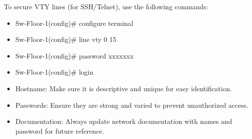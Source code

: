 \documentclass[a4paper,11pt]{article}
\begin{document}
\begin{tcolorbox}[colframe=gray!80, colback=gray!20, coltitle=black, title= Securing Remote Access (VTY Lines)]
     To secure VTY lines (for SSH/Telnet), use the following commands:\\
    \begin{itemize}
        \item Sw-Floor-1(config)\# configure terminal\\
        \item Sw-Floor-1(config)\# line vty 0 15\\
        \item Sw-Floor-1(config)\# password xxxxxxx\\
        \item Sw-Floor-1(config)\# login\\
    \end{itemize}
     
\end{tcolorbox}

\begin{tcolorbox}[colframe=gray!80, colback=gray!20, coltitle=black, title= Recap]
     
    \begin{itemize}
        \item Hostname: Make sure it  is descriptive and unique for easy identification.\\
        \item Passwords: Ensure they are strong and varied to prevent unauthorized access.\\
        \item Documentation: Always update network documentation with names and password for future reference.\\
    \end{itemize}
\end{tcolorbox}
\end{document}
